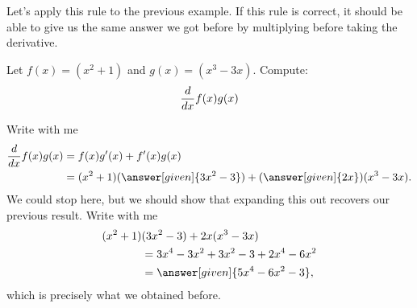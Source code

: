 \documentclass{ximera}
\begin{document}

Let's apply this rule to the previous example. If this rule is correct, it should be able to give us the same answer we got before by multiplying before taking the derivative.
\begin{example} 
Let $f(x)=(x^2+1)$ and $g(x)=(x^3-3x)$. Compute:
\[
\frac{d}{\mathop{}\!d x} f(x)g(x)
\]

\begin{explanation}
Write with me
\begin{align*}
\ddx f(x)g(x) &= f(x)g'(x) + f'(x)g(x)\\
&=(x^2+1)(\answer[given]{3x^2-3}) + (\answer[given]{2x})(x^3-3x).
\end{align*}
We could stop here, but we should show that expanding this out recovers
our previous result. Write with me
\begin{align*}
(x^2+1)&(3x^2-3) + 2x(x^3-3x)\\
  &= 3x^4-3x^2 +3x^2 -3 + 2x^4-6x^2\\
&=\answer[given]{5x^4-6x^2-3},
\end{align*}
which is precisely what we obtained before.
\end{explanation}
\end{example}
\end{document}
